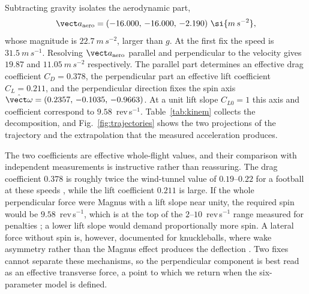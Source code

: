 Subtracting gravity isolates the aerodynamic part,
\[
  \vect a_{\rm aero}=(-16.000,\,-16.000,\,-2.190)~\si{m\,s^{-2}},
\]
whose magnitude is $22.7~\si{m\,s^{-2}}$, larger than $g$. At the first fix the speed is
$31.5~\si{m\,s^{-1}}$. Resolving $\vect a_{\rm aero}$ parallel and
perpendicular to the velocity gives $19.87$ and
$11.05~\si{m\,s^{-2}}$ respectively. The parallel part determines an effective drag coefficient
$C_D=0.378$, the perpendicular part an effective lift coefficient $C_L=0.211$,
and the perpendicular direction fixes the spin axis
$\hat{\vect\omega}=(0.2357,\,-0.1035,\,-0.9663)$. At a unit lift slope
$C_{L0}=1$ this axis and coefficient correspond to $9.58$~rev\,s$^{-1}$.
Table~\ref{tab:kinem} collects the decomposition, and
Fig.~\ref{fig:trajectories} shows the two projections of the trajectory and the
extrapolation that the measured acceleration produces.

The two coefficients are effective whole-flight values, and their comparison with
independent measurements is instructive rather than reassuring. The drag
coefficient $0.378$ is roughly twice the wind-tunnel value of $0.19$--$0.22$ for a
football at these speeds \citep{carre2005,goff2012}, while the lift coefficient
$0.211$ is large. If the whole perpendicular force were Magnus with a lift slope
near unity, the required spin would be $9.58$~rev\,s$^{-1}$, which is at the top
of the $2$--$10$~rev\,s$^{-1}$ range measured for penalties
\citep{asai2020,tsukada2008}; a lower lift slope would demand proportionally more
spin. A lateral force without spin is, however, documented for knuckleballs,
where wake asymmetry rather than the Magnus effect produces the deflection
\citep{texier2016}. Two fixes cannot separate these mechanisms, so the
perpendicular component is best read as an effective transverse force, a point to
which we return when the six-parameter model is defined.

